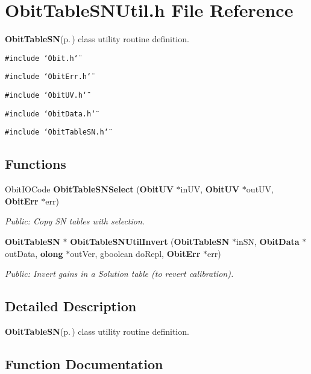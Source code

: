 \section{Obit\-Table\-SNUtil.h File Reference}
\label{ObitTableSNUtil_8h}
{\bf Obit\-Table\-SN}{\rm (p.\,\pageref{structObitTableSN})} class utility routine definition. 

{\tt \#include \char`\"{}Obit.h\char`\"{}}\par
{\tt \#include \char`\"{}Obit\-Err.h\char`\"{}}\par
{\tt \#include \char`\"{}Obit\-UV.h\char`\"{}}\par
{\tt \#include \char`\"{}Obit\-Data.h\char`\"{}}\par
{\tt \#include \char`\"{}Obit\-Table\-SN.h\char`\"{}}\par
\subsection*{Functions}
\begin{CompactItemize}
\item 
Obit\-IOCode {\bf Obit\-Table\-SNSelect} ({\bf Obit\-UV} $\ast$in\-UV, {\bf Obit\-UV} $\ast$out\-UV, {\bf Obit\-Err} $\ast$err)
\begin{CompactList}\small\item\em Public: Copy SN tables with selection. \item\end{CompactList}\item 
{\bf Obit\-Table\-SN} $\ast$ {\bf Obit\-Table\-SNUtil\-Invert} ({\bf Obit\-Table\-SN} $\ast$in\-SN, {\bf Obit\-Data} $\ast$out\-Data, {\bf olong} $\ast$out\-Ver, gboolean do\-Repl, {\bf Obit\-Err} $\ast$err)
\begin{CompactList}\small\item\em Public: Invert gains in a Solution table (to revert calibration). \item\end{CompactList}\end{CompactItemize}


\subsection{Detailed Description}
{\bf Obit\-Table\-SN}{\rm (p.\,\pageref{structObitTableSN})} class utility routine definition. 



\subsection{Function Documentation}
